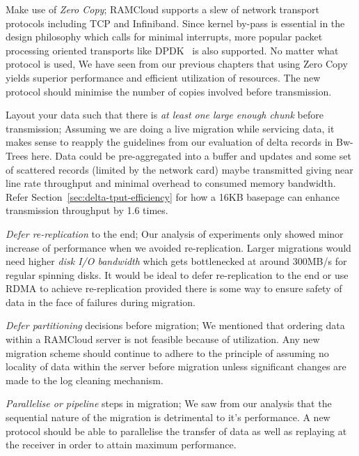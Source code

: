 \begin{myitemize}
\item Make use of {\em Zero Copy}; RAMCloud supports a slew of network transport protocols including TCP and Infiniband. Since kernel by-pass is essential in the design philosophy which calls for minimal 
interrupts, more popular packet processing oriented transports like DPDK~\cite{dpdk} is also supported. No matter what protocol is used, We have seen from our previous chapters that 
using Zero Copy yields superior performance and efficient utilization of resources. The new protocol should minimise the number of copies involved before transmission.

\item Layout your data such that there is {\em at least one large enough chunk} before transmission; Assuming we are doing a live migration while servicing data, it makes sense to reapply the guidelines 
from our evaluation of delta records in Bw-Trees here. Data could be pre-aggregated into a buffer
 and updates and some set of scattered records (limited by the network card) maybe 
 transmitted giving near line rate throughput and minimal overhead to consumed 
 memory bandwidth. Refer Section~\ref{sec:delta-tput-efficiency} for how a 16KB 
 basepage can enhance transmission throughput by 1.6 times.

\item {\em Defer re-replication} to the end; Our analysis of experiments only showed minor increase of performance when we avoided re-replication. 
Larger migrations would need higher {\em disk I/O bandwidth} which gets bottlenecked at around 
300MB/s for regular spinning disks. It would be ideal to defer re-replication to the end or use RDMA to achieve re-replication 
provided there is some way to ensure safety of data in the face of failures during migration.

\item {\em Defer partitioning} decisions before migration; We mentioned that ordering data within a RAMCloud server is not feasible because of utilization. Any new migration scheme should continue to adhere to the principle of assuming no locality 
of data within the server before migration unless significant changes are made to the log cleaning mechanism.

\item {\em Parallelise or pipeline} steps in migration; We saw from our analysis that the sequential nature of the migration is detrimental to it's performance. A new protocol should be 
able to parallelise the transfer of data as well as replaying at the receiver in order to attain maximum performance. 

\end{myitemize}
\newpage




